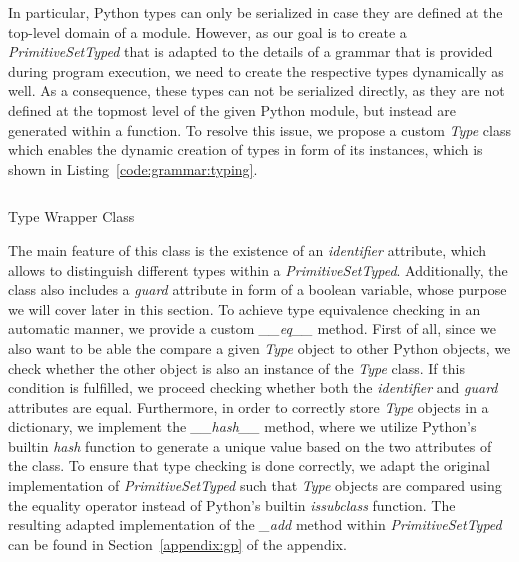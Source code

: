 In particular, Python types can only be serialized in case they are defined at the top-level domain of a module.
However, as our goal is to create a \emph{PrimitiveSetTyped} that is adapted to the details of a grammar that is provided during program execution, we need to create the respective types dynamically as well.
As a consequence, these types can not be serialized directly, as they are not defined at the topmost level of the given Python module, but instead are generated within a function.
To resolve this issue, we propose a custom \emph{Type} class which enables the dynamic creation of types in form of its instances, which is shown in Listing~\ref{code:grammar:typing}.
\begin{listing}
	\inputminted{python}{evostencils/grammar/typing.py}
	\caption{Type Wrapper Class}
	\label{code:grammar:typing}
\end{listing}
The main feature of this class is the existence of an \emph{identifier} attribute, which allows to distinguish different types within a \emph{PrimitiveSetTyped}.
Additionally, the class also includes a \emph{guard} attribute in form of a boolean variable, whose purpose we will cover later in this section. 
To achieve type equivalence checking in an automatic manner, we provide a custom \emph{\_\_eq\_\_} method.
First of all, since we also want to be able the compare a given \emph{Type} object to other Python objects, we check whether the other object is also an instance of the \emph{Type} class.
If this condition is fulfilled, we proceed checking whether both the \emph{identifier} and \emph{guard} attributes are equal.
Furthermore, in order to correctly store \emph{Type} objects in a dictionary, we implement the \emph{\_\_hash\_\_} method, where we utilize Python's builtin \emph{hash} function to generate a unique value based on the two attributes of the class. 
To ensure that type checking is done correctly, we adapt the original implementation of \emph{PrimitiveSetTyped} such that \emph{Type} objects are compared using the equality operator instead of Python's builtin \emph{issubclass} function.
The resulting adapted implementation of the \emph{\_add} method within \emph{PrimitiveSetTyped} can be found in Section~\ref{appendix:gp} of the appendix.

